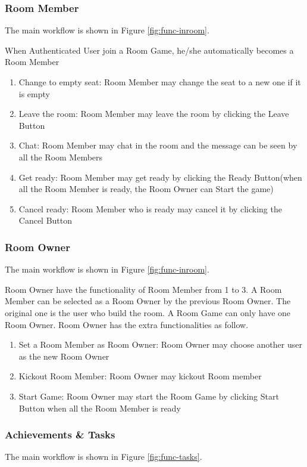 \documentclass[11pt]{article}
\begin{document}
\subsubsection{Room Member}
The main workflow is shown in Figure \ref{fig:func-inroom}.

When Authenticated User join a Room Game, he/she automatically becomes a Room Member
\begin{enumerate}
\item
Change to empty seat: Room Member may change the seat to a new one if it is empty
\item
Leave the room: Room Member may leave the room by clicking the Leave Button
\item
Chat: Room Member may chat in the room and the message can be seen by all the Room Members
\item
Get ready: Room Member may get ready by clicking the Ready Button(when all the Room Member is ready, the Room Owner can Start the game)
\item
Cancel ready: Room Member who is ready may cancel it by clicking the Cancel Button
\end{enumerate}

\subsubsection{Room Owner}
The main workflow is shown in Figure \ref{fig:func-inroom}.

Room Owner have the functionality of Room Member from 1 to 3. A Room Member can be selected as a Room Owner by the previous Room Owner. The original one is the user who build the room. A Room Game can only have one Room Owner. Room Owner has the extra functionalities as follow.
\begin{enumerate}
\item
Set a Room Member as Room Owner: Room Owner may choose another user as the new Room Owner
\item
Kickout Room Member: Room Owner may kickout Room member
\item
Start Game: Room Owner may start the Room Game by clicking Start Button when all the Room Member is ready
\end{enumerate}

\subsubsection{Achievements \& Tasks}
The main workflow is shown in Figure \ref{fig:func-tasks}.
\end{document}
